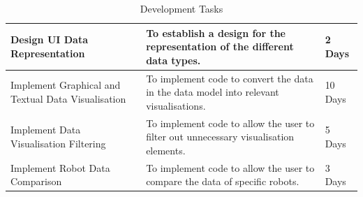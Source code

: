 \documentclass[titlepage,hidelinks,10pt]{article}
\begin{document}
\begin{table}[H]
\begin{tabular}[h]{ |>{\raggedright}p{5cm}|>{\raggedright}p{7cm}|p{3cm}| }
  Design UI Data Representation 					& To establish a design for the representation of the different data types. 											& 2 Days \\ \hline
  Implement Graphical and Textual Data Visualisation & To implement code to convert the data in the data model into relevant visualisations. 								& 10 Days \\ \hline
  Implement Data Visualisation Filtering 			& To implement code to allow the user to filter out unnecessary visualisation elements. 								& 5 Days \\ \hline
  Implement Robot Data Comparison 					& To implement code to allow the user to compare the data of specific robots. 											& 3 Days \\ \hline
\end{tabular}
\caption{Development Tasks\label{DevTaskTable}}
\end{table}

\newpage
\end{document}
